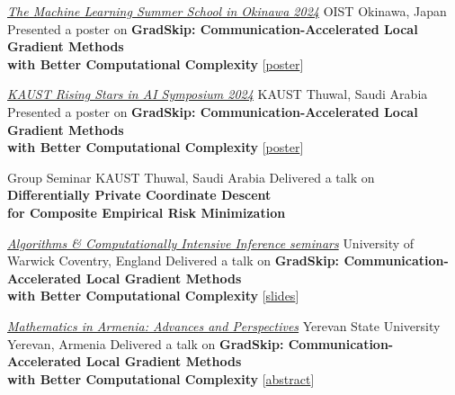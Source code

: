 \documentclass[10pt,a4paper,sans]{moderncv}        %
\newcommand{\kaust}{KAUST}
\newcommand{\yerevan}{Yerevan, Armenia}
\newcommand{\thuwal}{Thuwal, Saudi Arabia}
\newcommand{\ysu}{Yerevan State University}
\begin{document}
  {\textcolor{accent}{\href{https://groups.oist.jp/mlss}{\textit{The Machine Learning Summer School in Okinawa 2024}}}}
  {OIST}
  {Okinawa, Japan}
  {}
  {
    Presented a poster on \textbf{GradSkip: Communication-Accelerated Local Gradient Methods \\ with Better Computational Complexity} [{\href{https://artomaranjyan.github.io/assets/pdf/GradSkip_MLSS_Okinawa.pdf}{poster}}]
  }

  {\textcolor{accent}{\href{https://cemse.kaust.edu.sa/ai/aii-symp-2024}{\textit{KAUST Rising Stars in AI Symposium 2024}}}}
  {\kaust}
  {\thuwal}
  {}
  {
    Presented a poster on \textbf{GradSkip: Communication-Accelerated Local Gradient Methods \\ with Better Computational Complexity} [{\href{https://artomaranjyan.github.io/assets/pdf/GradSkip_Rising_Stars.pdf}{poster}}]
  }



  {Group Seminar}
  {\kaust}
  {\thuwal}
  {}
  {
    Delivered a talk on \textbf{Differentially Private Coordinate Descent \\ for Composite Empirical Risk Minimization}
  }

  {\textcolor{accent}{\href{https://warwick.ac.uk/fac/sci/statistics/news/algorithms-seminars/\#:\textasciitilde:text=06/10-,Artavazd\%20Maranjyan,-Link\%20opens\%20in}{\textit{Algorithms \& Computationally Intensive Inference seminars}}}}
  {University of Warwick}
  {Coventry, England}
  {}
  {
    Delivered a talk on \textbf{GradSkip: Communication-Accelerated Local Gradient Methods \\ with Better Computational Complexity} [{\href{https://warwick.ac.uk/fac/sci/statistics/news/algorithms-seminars/slides_2023_10_06_arto_maranjyan_gradskip.pdf}{slides}}]
  }

  {\textcolor{accent}{\href{http://mathconf.sci.am/index.html}{\textit{Mathematics in Armenia: Advances and Perspectives}}}}
  {\ysu}
  {\yerevan}
  {}
  {
    Delivered a talk on \textbf{GradSkip: Communication-Accelerated Local Gradient Methods \\ with Better Computational Complexity} [{\href{http://mathconf.sci.am/MiA2023AbstractsBook.pdf\#page=60}{abstract}}]
  }
\end{document}
